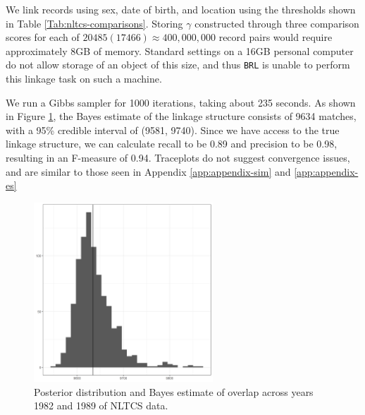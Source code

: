 \documentclass[ba]{imsart}
\begin{document}
	We link records using sex, date of birth, and location using the thresholds shown in Table \ref{Tab:nltcs-comparisons}. Storing $\gamma$ constructed through three comparison scores for each of $20485 (17466) \approx 400,000,000$ record pairs would require approximately 8GB of memory. Standard settings on a 16GB personal computer do not allow storage of an object of this size, and thus \texttt{BRL} is unable to perform this linkage task on such a machine. {}
	
	We run a Gibbs sampler for 1000 iterations, taking about 235 seconds. As shown in Figure \ref{fig:nltcs-overlap-plot}, the Bayes estimate of the linkage structure consists of 9634 matches, with a 95\% credible interval of (9581, 9740). Since we have access to the true linkage structure, we can calculate recall to be 0.89 and precision to be 0.98, resulting in an F-measure of 0.94. Traceplots do not suggest convergence issues, and are similar to those seen in Appendix \ref{app:appendix-sim} and \ref{app:appendix-es}
	
	\begin{figure}[h]
		\begin{center}
			\includegraphics[width=0.6\textwidth]{../notes/figures/nltcs/overlap_posterior4}
			\caption{Posterior distribution and Bayes estimate of overlap across years 1982 and 1989 of NLTCS data.}
			\label{fig:nltcs-overlap-plot}
		\end{center}
	\end{figure}
	
\end{document}
